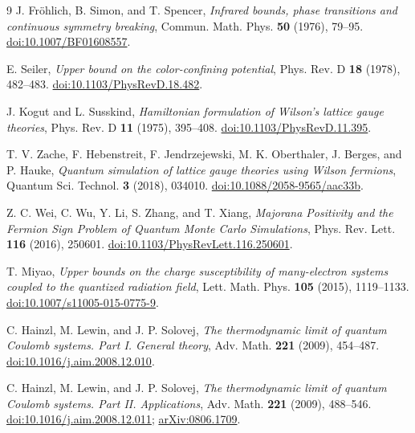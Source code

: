 \begin{thebibliography}{9}
J. Fr\"ohlich, B. Simon, and T. Spencer,
\emph{Infrared bounds, phase transitions and continuous symmetry breaking},
Commun. Math. Phys. \textbf{50} (1976), 79--95.
\href{https://doi.org/10.1007/BF01608557}{doi:10.1007/BF01608557}.

E. Seiler, \emph{Upper bound on the color-confining potential},
Phys. Rev. D \textbf{18} (1978), 482--483.
\href{https://doi.org/10.1103/PhysRevD.18.482}{doi:10.1103/PhysRevD.18.482}.

J. Kogut and L. Susskind,
\emph{Hamiltonian formulation of Wilson's lattice gauge theories},
Phys. Rev. D \textbf{11} (1975), 395--408.
\href{https://doi.org/10.1103/PhysRevD.11.395}{doi:10.1103/PhysRevD.11.395}.

T. V. Zache, F. Hebenstreit, F. Jendrzejewski, M. K. Oberthaler,
J. Berges, and P. Hauke,
\emph{Quantum simulation of lattice gauge theories using Wilson fermions},
Quantum Sci. Technol. \textbf{3} (2018), 034010.
\href{https://doi.org/10.1088/2058-9565/aac33b}{doi:10.1088/2058-9565/aac33b}.

Z. C. Wei, C. Wu, Y. Li, S. Zhang, and T. Xiang,
\emph{Majorana Positivity and the Fermion Sign Problem of Quantum
Monte Carlo Simulations},
Phys. Rev. Lett. \textbf{116} (2016), 250601.
\href{https://doi.org/10.1103/PhysRevLett.116.250601}{doi:10.1103/PhysRevLett.116.250601}.

T. Miyao,
\emph{Upper bounds on the charge susceptibility of many-electron
systems coupled to the quantized radiation field},
Lett. Math. Phys. \textbf{105} (2015), 1119--1133.
\href{https://doi.org/10.1007/s11005-015-0775-9}{doi:10.1007/s11005-015-0775-9}.

C. Hainzl, M. Lewin, and J. P. Solovej,
\emph{The thermodynamic limit of quantum Coulomb systems.
Part I. General theory},
Adv. Math. \textbf{221} (2009), 454--487.
\href{https://doi.org/10.1016/j.aim.2008.12.010}{doi:10.1016/j.aim.2008.12.010}.

C. Hainzl, M. Lewin, and J. P. Solovej,
\emph{The thermodynamic limit of quantum Coulomb systems.
Part II. Applications},
Adv. Math. \textbf{221} (2009), 488--546.
\href{https://doi.org/10.1016/j.aim.2008.12.011}{doi:10.1016/j.aim.2008.12.011};
\href{https://arxiv.org/abs/0806.1709}{arXiv:0806.1709}.
\end{thebibliography}
